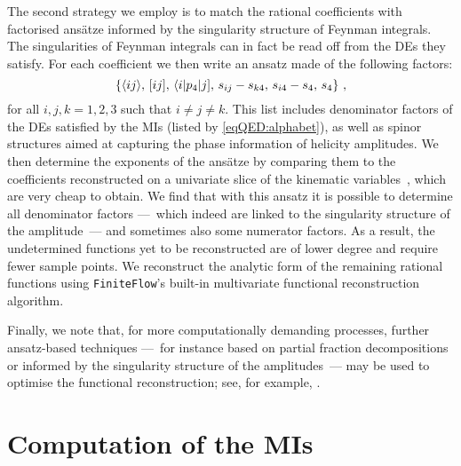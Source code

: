 \documentclass[main.tex]{subfiles}
\begin{document}
The second strategy we employ is to match the rational coefficients with factorised ans\"atze informed by the singularity structure of Feynman integrals. The singularities of Feynman integrals can in fact be read off from the \acp{DE} they satisfy. For each coefficient we then write an ansatz made of the following factors:
\begin{equation}
	\left\{\langle ij \rangle , \, [ ij ] , \, \langle i|p_4|j] , \, s_{ij} - s_{k4} , \, s_{i4} - s_4 , \, s_4 \right\} \,,
\end{equation}
for all $i, j, k = 1, 2, 3$ such that $i\neq j \neq k$. This list includes denominator factors of the \acp{DE} satisfied by the \acp{MI} (listed by \cref{eqQED:alphabet}), 
as well as spinor structures aimed at capturing the phase information of helicity amplitudes.
We then determine the exponents of the ans\"atze by comparing them to the coefficients reconstructed on a univariate slice of the kinematic variables~\cite{Abreu:2019odu}, which are very cheap to obtain. We find that with this ansatz it is possible to determine all denominator factors ---~which indeed are linked to the singularity structure of the amplitude~--- and sometimes also some numerator factors. As a result, the undetermined functions yet to be reconstructed are of lower degree and require fewer sample points. 
We reconstruct the analytic form of the remaining rational functions using \texttt{FiniteFlow}'s built-in multivariate functional reconstruction algorithm.

Finally, we note that, for more computationally demanding processes, further ansatz-based techniques ---~for instance based on 
partial fraction decompositions or informed by the singularity structure of the amplitudes~--- may be used to optimise 
the functional reconstruction; see, for example, .

\section{Computation of the \aclp{MI}}
\label{secQED:spec-fns}
\end{document}
